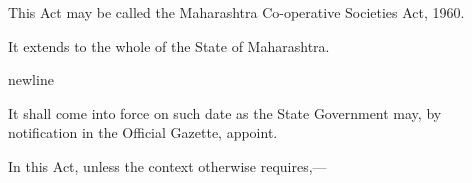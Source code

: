 \documentclass[reprint]{mhact}
\begin{document}
      

      

      \begin{subsectionlist}

         This Act may be called the Maharashtra
        Co-operative Societies Act, 1960.

         It extends to the whole of the State of
        Maharashtra.

        newline
        
         It shall come into force on%
        such date
        as the State Government may, by notification in the Official
        Gazette, appoint.

       \end{subsectionlist}
     
      
      In this Act, unless the context otherwise requires,---
\end{document}
